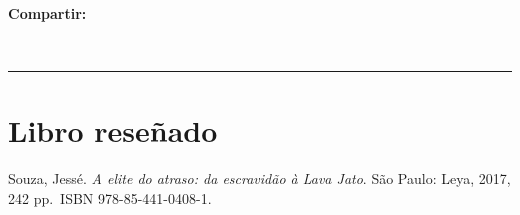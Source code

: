 \documentclass{article}
\begin{document}
\begin{textblock*}{68mm}
{\begin{minipage}[t]{68mm}
{\bfseries\color{azulrevista!70}Compartir:}\par\vspace{3pt}
{\large
\href{https://bsky.app/intent/compose?text=https%3A%2F%2Farchiveofourown.org%2Fworks%2F57620047%2Fchapters%2F146620033}{}~
\href{mailto:?subject=Rese%C3%B1a%20sobre%20un%20libro&body=https%3A%2F%2Farchiveofourown.org%2Fworks%2F57620047%2Fchapters%2F146620033}{}~
\href{https://www.facebook.com/sharer/sharer.php?u=https%3A%2F%2Farchiveofourown.org%2Fworks%2F57620047%2Fchapters%2F146620033}{}~
\href{https://www.linkedin.com/sharing/share-offsite/?url=https%3A%2F%2Farchiveofourown.org%2Fworks%2F57620047%2Fchapters%2F146620033}{}~
\href{https://www.reddit.com/submit?url=https%3A%2F%2Farchiveofourown.org%2Fworks%2F57620047%2Fchapters%2F146620033&title=Rese%C3%B1a%20sobre%20un%20libro}{}~
\href{https://www.researchgate.net/search?q=Rese%C3%B1a%20sobre%20un%20libro}{}~
\href{https://t.me/share/url?url=https%3A%2F%2Farchiveofourown.org%2Fworks%2F57620047%2Fchapters%2F146620033&text=Rese%C3%B1a%20sobre%20un%20libro}{}~
\href{https://wa.me/?text=https%3A%2F%2Farchiveofourown.org%2Fworks%2F57620047%2Fchapters%2F146620033}{}~
\href{https://twitter.com/intent/tweet?url=https%3A%2F%2Farchiveofourown.org%2Fworks%2F57620047%2Fchapters%2F146620033&text=Rese%C3%B1a%20sobre%20un%20libro}{}
}\par
\end{minipage}%
}%
\end{textblock*}


\bigskip
\noindent\rule{\linewidth}{0.4pt}
\bigskip

\section{Libro reseñado}

\begin{tcolorbox}[colback=white,colframe=azulrevista,leftrule=3pt,rightrule=0pt,toprule=0pt,bottomrule=0pt,arc=0pt,left=8pt,right=4pt,top=3pt,bottom=3pt,before skip=4pt,after skip=4pt]
{\sffamily\small
Souza, Jessé. \textit{A elite do atraso: da escravidão à Lava Jato}. São Paulo: Leya, 2017, 242 pp. ISBN 978-85-441-0408-1.

}
\end{tcolorbox}
\end{document}
